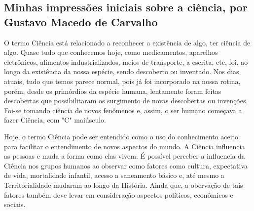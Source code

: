 \subsection{Minhas impressões iniciais sobre a ciência, por Gustavo Macedo de Carvalho}

O termo Ciência está relacionado a reconhecer a existência de algo, ter ciência de algo. Quase tudo que conhecemos hoje, como medicamentos, aparelhos eletrônicos, alimentos industrializados, meios de transporte, a escrita, etc, foi, ao longo da existência da nossa espécie, sendo descoberto ou inventado. Nos dias atuais, tudo que temos parece normal, pois já foi incorporado na nossa rotina, porém, desde os primórdios da espécie humana, lentamente foram feitas descobertas que possibilitaram os surgimento de novas descobertas ou invenções. Foi-se tomando ciência de novos fenômenos e, assim, o ser humano começava a fazer Ciência, com "C" maiúsculo.

Hoje, o termo Ciência pode ser entendido como \citep{wikipedia_scientific_2022} o uso do conhecimento aceito para facilitar o entendimento de novos aspectos do mundo. A Ciência influencia as pessoas e muda a forma como elas vivem. É possível perceber a influencia da Ciência nos grupos humanos ao observar como fatores como cultura, expectativa de vida, mortalidade infantil, acesso a saneamento básico e, até mesmo a \gls{Territorialidade} mudaram ao longo da História. Ainda que, a obervação de tais fatores também deve levar em consideração aspectos políticos, econômicos e sociais.